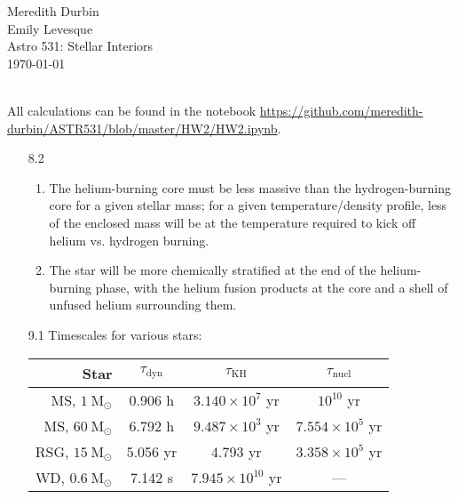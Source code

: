 \documentclass[11pt]{article}
\newcommand\msol{\mathrm{M}_\odot}
\begin{document}
\begin{flushright}Meredith Durbin\\
Emily Levesque\\
Astro 531: Stellar Interiors\\
\today\\

\end{flushright}

 \\[6pt]

All calculations can be found in the notebook \url{https://github.com/meredith-durbin/ASTR531/blob/master/HW2/HW2.ipynb}.

\begin{enumerate}

\item [8.2]
	\begin{enumerate}
	
    \item The helium-burning core must be less massive than the hydrogen-burning core for a given stellar mass; for a given temperature/density profile, less of the enclosed mass will be at the temperature required to kick off helium vs. hydrogen burning.
    
    \item The star will be more chemically stratified at the end of the helium-burning phase, with the helium fusion products at the core and a shell of unfused helium surrounding them.
    
    \end{enumerate}

\item [9.1] Timescales for various stars:

    \begin{table}[H]
    \centering
    \begin{tabular}{ r | c | c | c }
      Star & $\tau_\mathrm{dyn}$ & $\tau_\mathrm{KH}$ & $\tau_\mathrm{nucl}$ \\ \hline
      MS, $1~\msol$ & 0.906 h & $3.140\times10^7$ yr & $10^{10}$ yr  \\
      MS, $60~\msol$ & 6.792 h & $9.487\times10^3$ yr & $7.554\times10^{5}$ yr  \\
      RSG, $15~\msol$ & 5.056 yr & 4.793 yr & $3.358\times10^{5}$ yr   \\
      WD, $0.6~\msol$ & 7.142 s & $7.945\times10^{10}$ yr & ---  \\
    \end{tabular}
    \end{table}


\end{enumerate}
\end{document}
